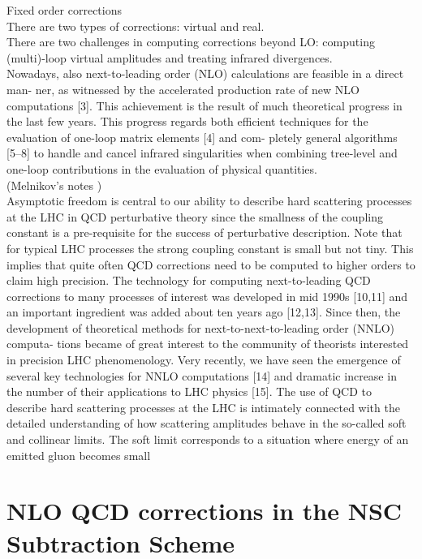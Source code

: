 \documentclass[a4paper, 12pt]{book}
\begin{document}
Fixed order corrections \\
There are two types of corrections: virtual and real. \\
There are two challenges in computing corrections beyond LO: computing (multi)-loop virtual amplitudes and treating infrared divergences. 
\\
Nowadays, also next-to-leading order (NLO) calculations are feasible in a direct man-
ner, as witnessed by the accelerated production rate of new NLO computations [3]. This
achievement is the result of much theoretical progress in the last few years. This progress
regards both efficient techniques for the evaluation of one-loop matrix elements [4] and com-
pletely general algorithms [5–8] to handle and cancel infrared singularities when combining
tree-level and one-loop contributions in the evaluation of physical quantities. \\
 (Melnikov's notes ) \cite{Melnikov2018} \\
Asymptotic freedom is central to our ability to describe hard scattering processes at the LHC in
QCD perturbative theory since the smallness of the coupling constant is a pre-requisite for the success of
perturbative description. Note that for typical LHC processes the strong coupling constant is small but not
tiny. This implies that quite often QCD corrections need to be computed to higher orders to claim high
precision. The technology for computing next-to-leading QCD corrections to many processes of interest
was developed in mid 1990s [10,11] and an important ingredient was added about ten years ago [12,13].
Since then, the development of theoretical methods for next-to-next-to-leading order (NNLO) computa-
tions became of great interest to the community of theorists interested in precision LHC phenomenology.
Very recently, we have seen the emergence of several key technologies for NNLO computations [14] and
dramatic increase in the number of their applications to LHC physics [15].
The use of QCD to describe hard scattering processes at the LHC is intimately connected with
the detailed understanding of how scattering amplitudes behave in the so-called soft and collinear limits.
The soft limit corresponds to a situation where energy of an emitted gluon becomes small



\clearpage

\chapter{NLO QCD corrections in the NSC Subtraction Scheme}
\end{document}
